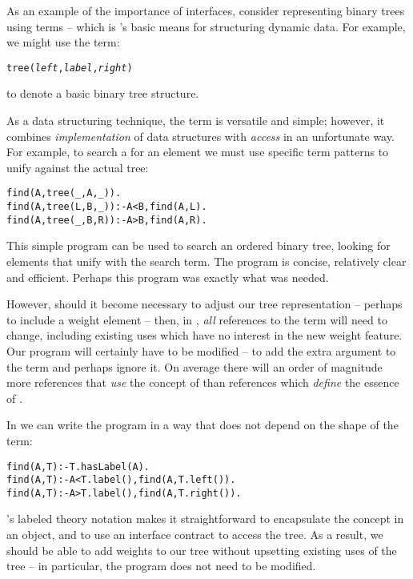 As an example of the importance of interfaces, consider representing binary trees using  \prolog terms -- which is \prolog's basic means for structuring dynamic data. For example, we might use the  term:
\begin{alltt}
tree(\emph{left},\emph{label},\emph{right})
\end{alltt}
to denote a basic binary tree structure. 

As a data structuring technique, the \prolog term is versatile and simple; however, it combines \emph{implementation} of data structures with \emph{access} in an unfortunate way. For example, to search a  for an element we must use specific  term patterns to unify against the actual tree:
\begin{alltt}
find(A,tree(_,A,_)).
find(A,tree(L,B,_)) :- A<B, find(A,L).
find(A,tree(_,B,R)) :- A>B, find(A,R).
\end{alltt}
This simple program can be used to search an ordered binary tree, looking for elements that unify with the search term. The  program is concise, relatively clear and efficient. Perhaps this program was exactly what was needed.

However, should it become necessary to adjust our tree representation -- perhaps to include a weight element -- then, in \prolog, \emph{all} references to the  term will need to change, including existing uses which have no interest in the new weight feature. Our  program will certainly have to be modified -- to add the extra argument to the  term and perhaps ignore it. On average there will an order of magnitude more references that \emph{use} the concept of  than references which \emph{define} the essence of .

In \go we can write the  program in a way that does not depend on the shape of the  term:
\begin{alltt}
find(A,T) :- T.hasLabel(A).
find(A,T) :- A<T.label(), find(A,T.left()).
find(A,T) :- A>T.label(), find(A,T.right()).
\end{alltt}
\go's labeled theory notation makes it straightforward to encapsulate the  concept in an object, and to use an interface contract to access the tree. As a result, we should be able to add weights to our tree without upsetting existing uses of the tree -- in particular, the  program does not need to be modified.

